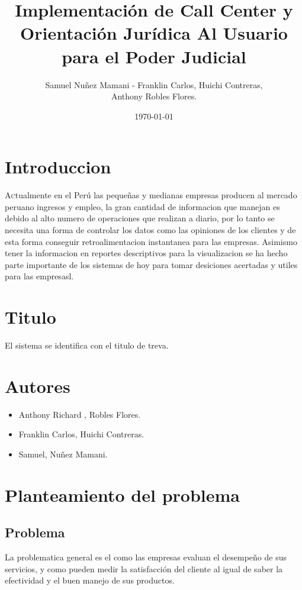 \documentclass[twoside,twocolumn]{article}
\title{Implementación de Call Center y Orientación Jurídica Al Usuario para el Poder Judicial}
\author{Samuel Nuñez Mamani - Franklin Carlos, Huichi Contreras, \\
Anthony Robles Flores. }
\date{\today}
\begin{document}
\maketitle


\section{Introduccion}
\lettrine[nindent=0em,lines=3]{A}ctualmente en el Perú las pequeñas y medianas empresas producen al mercado peruano ingresos y empleo, la gran cantidad de informacion que manejan es debido al alto numero de operaciones que realizan a diario, por lo tanto se necesita una forma de controlar los datos como las opiniones de los clientes y de esta forma conseguir retroalimentacion instantanea para las empresas. Asimismo tener la informacion en reportes descriptivos para la visualizacion se ha hecho parte importante de los sistemas de hoy para tomar desiciones acertadas y utiles para las empresasl.

\section{Titulo}
El sistema se identifica con el titulo de treva.

\section{Autores}
\begin{itemize}
\item Anthony Richard , Robles Flores.
\item Franklin Carlos, Huichi Contreras.
\item Samuel, Nuñez Mamani.
\end{itemize}

\section{Planteamiento del problema}
\subsection{Problema}
La problematica general es el como las empresas evaluan el desempeño de sus servicios, y como pueden medir la satisfacción del cliente al igual de saber la efectividad y el buen manejo de sus productos.
\end{document}
